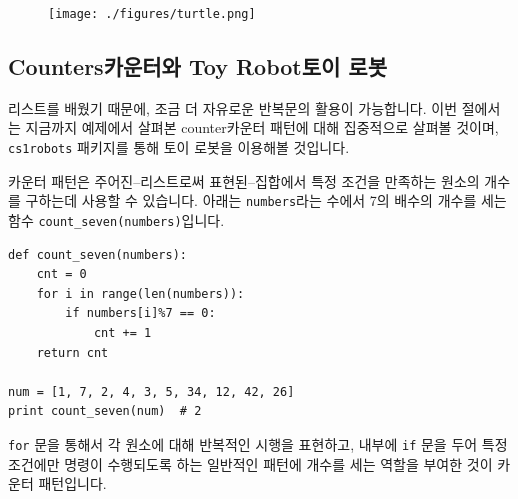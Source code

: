 \documentclass[../main.tex]{subfiles}
\begin{document}
\begin{figure}[H]
  \centering
  \texttt{[image: ./figures/turtle.png]}
\end{figure}

\subsection{Counters카운터와 Toy Robot토이 로봇}
리스트를 배웠기 때문에, 조금 더 자유로운 반복문의 활용이 가능합니다.
이번 절에서는 지금까지 예제에서 살펴본 counter카운터 패턴에 대해 집중적으로 살펴볼 것이며, \texttt{cs1robots} 패키지를 통해 토이 로봇을 이용해볼 것입니다.

카운터 패턴은 주어진--리스트로써 표현된--집합에서 특정 조건을 만족하는 원소의 개수를 구하는데 사용할 수 있습니다.
아래는 \texttt{numbers}라는 수에서 7의 배수의 개수를 세는 함수 \texttt{count\_seven(numbers)}입니다.
\begin{verbatim}
def count_seven(numbers):
    cnt = 0
    for i in range(len(numbers)):
        if numbers[i]%7 == 0:
            cnt += 1
    return cnt

num = [1, 7, 2, 4, 3, 5, 34, 12, 42, 26]
print count_seven(num)  # 2
\end{verbatim}
\texttt{for} 문을 통해서 각 원소에 대해 반복적인 시행을 표현하고, 내부에 \texttt{if} 문을 두어 특정 조건에만 명령이 수행되도록 하는 일반적인 패턴에 개수를 세는 역할을 부여한 것이 카운터 패턴입니다.
\end{document}
